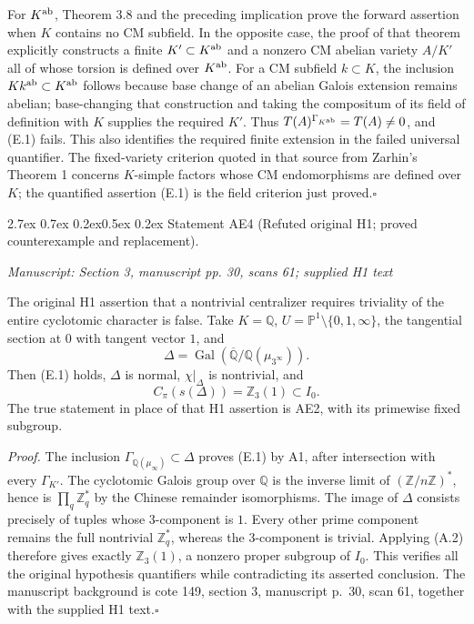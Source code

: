 \documentclass[11pt,a4paper]{article}
\makeatletter
\newcommand{\passage}[1]{\par\smallskip\noindent\textit{Manuscript: #1}\par\smallskip}
\renewcommand\paragraph{\@startsection{paragraph}{4}{\z@}%
  {2.7ex \@plus 0.7ex \@minus 0.2ex}{0.5ex \@plus 0.2ex}%
  {\normalfont\normalsize\bfseries}}
\makeatother
\begin{document}
For $K^{\rm ab}$, Theorem 3.8 and the preceding implication prove the forward assertion when $K$ contains no CM subfield. In the opposite case, the proof of that theorem explicitly constructs a finite $K'\subset K^{\rm ab}$ and a nonzero CM abelian variety $A/K'$ all of whose torsion is defined over $K^{\rm ab}$. For a CM subfield $k\subset K$, the inclusion $Kk^{\rm ab}\subset K^{\rm ab}$ follows because base change of an abelian Galois extension remains abelian; base-changing that construction and taking the compositum of its field of definition with $K$ supplies the required $K'$. Thus $T(A)^{\Gamma_{K^{\rm ab}}}=T(A)\ne0$, and (E.1) fails. This also identifies the required finite extension in the failed universal quantifier. The fixed-variety criterion quoted in that source from Zarhin's Theorem 1 concerns $K$-simple factors whose CM endomorphisms are defined over $K$; the quantified assertion (E.1) is the field criterion just proved.\hfill$\square$

\paragraph{Statement AE4 (Refuted original H1; proved counterexample and replacement).}\label{res:AE4}
\passage{Section 3, manuscript pp. 30, scans 61; supplied H1 text}

The original H1 assertion that a nontrivial centralizer requires triviality of the entire cyclotomic character is false. Take $K=\mathbb Q$, $U=\mathbb P^1\setminus\{0,1,\infty\}$, the tangential section at $0$ with tangent vector $1$, and
\[
 \Delta=\operatorname{Gal}(\overline{\mathbb Q}/\mathbb Q(\mu_{3^\infty})).
\]
Then (E.1) holds, $\Delta$ is normal, $\chi|_\Delta$ is nontrivial, and
\[
 C_\pi(s(\Delta))=\mathbb Z_3(1)\subset I_0.
\]
The true statement in place of that H1 assertion is AE2, with its primewise fixed subgroup.

\emph{Proof.} The inclusion $\Gamma_{\mathbb Q(\mu_\infty)}\subset\Delta$ proves (E.1) by A1, after intersection with every $\Gamma_{K'}$. The cyclotomic Galois group over $\mathbb Q$ is the inverse limit of $(\mathbb Z/n\mathbb Z)^*$, hence is $\prod_q\mathbb Z_q^*$ by the Chinese remainder isomorphisms. The image of $\Delta$ consists precisely of tuples whose $3$-component is $1$. Every other prime component remains the full nontrivial $\mathbb Z_q^*$, whereas the $3$-component is trivial. Applying (A.2) therefore gives exactly $\mathbb Z_3(1)$, a nonzero proper subgroup of $I_0$. This verifies all the original hypothesis quantifiers while contradicting its asserted conclusion. The manuscript background is cote 149, section 3, manuscript p.~30, scan 61, together with the supplied H1 text.\hfill$\square$
\end{document}
